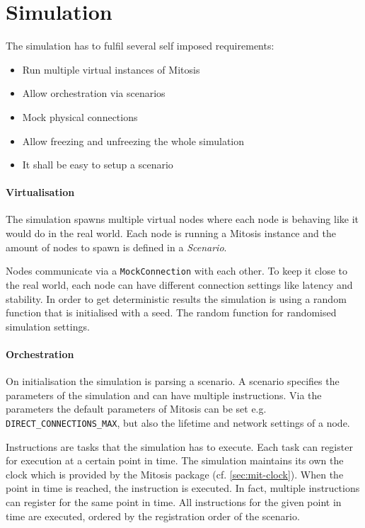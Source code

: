 \section{Simulation}
The simulation has to fulfil several self imposed requirements:
\begin{itemize}
    \item Run multiple virtual instances of Mitosis
    \item Allow orchestration via scenarios
    \item Mock physical connections
    \item Allow freezing and unfreezing the whole simulation
    \item It shall be easy to setup a scenario
\end{itemize}

\paragraph{Virtualisation}
The simulation spawns multiple virtual nodes where each node is behaving like it would do in the real world. Each node is running a Mitosis instance and the amount of nodes to spawn is defined in a \textit{Scenario}. 

Nodes communicate via a \lstinline{MockConnection} with each other. To keep it close to the real world, each node can have different connection settings like latency and stability.
In order to get deterministic results the simulation is using a random function that is initialised with a seed. The random function for randomised simulation settings.

\paragraph{Orchestration}
On initialisation the simulation is parsing a scenario. A scenario specifies the parameters of the simulation and can have multiple instructions. Via the parameters the default parameters of Mitosis can be set e.g. \lstinline{DIRECT_CONNECTIONS_MAX}, but also the lifetime and network settings of a node.

Instructions are tasks that the simulation has to execute. Each task can register for execution at a certain point in time.
The simulation maintains its own the clock which is provided by the Mitosis package (cf. \vref{sec:mit-clock}).
When the point in time is reached, the instruction is executed. In fact, multiple instructions can register for the same point in time. All instructions for the given point in time are executed, ordered by the registration order of the scenario.

